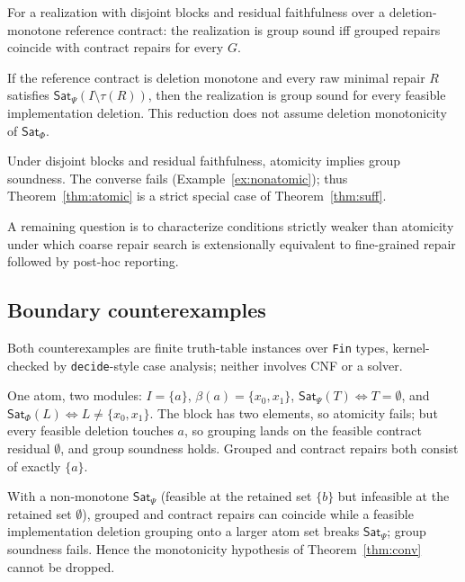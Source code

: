 \documentclass[sigplan,10pt,review,anonymous]{acmart}
\theoremstyle{acmdefinition}
\newcommand{\code}[1]{\texttt{#1}}
\newcommand{\SatPsi}{{\mathsf{Sat}_\Psi}}
\newcommand{\SatPhi}{{\mathsf{Sat}_\Phi}}
\begin{document}
\begin{theorem}[Characterization]
\label{thm:iff}
For a realization with disjoint blocks and residual faithfulness over a
deletion-monotone reference contract: the realization is group sound iff
grouped repairs coincide with contract repairs for every $G$.
\end{theorem}

\begin{lemma}
\label{lem:audit}
If the reference contract is deletion monotone and every raw minimal repair
$R$ satisfies $\SatPsi(I \setminus \tau(R))$, then the realization is group
sound for every feasible implementation deletion. This reduction does not
assume deletion monotonicity of $\SatPhi$.
\end{lemma}

\begin{lemma}[Hierarchy]
\label{lem:hier}
Under disjoint blocks and residual faithfulness, atomicity implies group
soundness. The converse fails (Example~\ref{ex:nonatomic}); thus
Theorem~\ref{thm:atomic} is a strict special case of Theorem~\ref{thm:suff}.
\end{lemma}

A remaining question is to characterize conditions strictly weaker than
atomicity under which coarse repair search is extensionally equivalent to
fine-grained repair followed by post-hoc reporting.

\subsection{Boundary counterexamples}
\label{sec:cex}

Both counterexamples are finite truth-table instances over \code{Fin} types,
kernel-checked by \code{decide}-style case analysis; neither involves CNF or
a solver.

\begin{example}
\label{ex:nonatomic}
One atom, two modules: $I = \{a\}$, $\beta(a) = \{x_0, x_1\}$,
$\SatPsi(T) \iff T = \emptyset$, and $\SatPhi(L) \iff L \neq \{x_0,x_1\}$.
The block has two elements, so atomicity fails; but every feasible deletion
touches $a$, so grouping lands on the feasible contract residual
$\emptyset$, and group soundness holds. Grouped and contract repairs both
consist of exactly $\{a\}$.
\end{example}

\begin{example}
\label{ex:nonmono}
With a non-monotone $\SatPsi$ (feasible at the retained set $\{b\}$ but
infeasible at the retained set $\emptyset$), grouped and contract repairs can
coincide while a feasible implementation deletion grouping onto a larger atom
set breaks $\SatPsi$; group soundness fails. Hence the monotonicity
hypothesis of Theorem~\ref{thm:conv} cannot be dropped.
\end{example}
\end{document}
